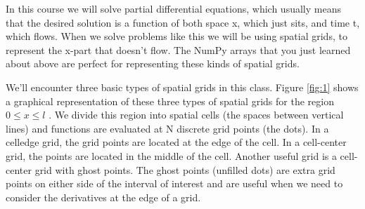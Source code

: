     In this course we will solve partial differential equations, which usually means that the desired solution is a function of both space x, which just sits, and time t, which flows. When we solve problems like this we will be using spatial grids, to represent the x-part that doesn\rq t flow. The NumPy arrays that you just learned about above are perfect for representing these kinds of spatial grids. 
    
    We\rq ll encounter three basic types of spatial grids in this class. Figure \ref{fig:1} shows a graphical representation of these three types of spatial grids for the region 
    \begin{math}0\leqslant x \leqslant l \end{math} . We divide this region into spatial cells (the spaces between vertical lines) and functions are evaluated at N discrete grid points (the dots). In a celledge grid, the grid points are located at the edge of the cell. In a cell-center grid, the points are located in the middle of the cell. Another useful grid is a cell-center grid with ghost points. The ghost points (unfilled dots) are extra grid points on either side of the interval of interest and are useful when we need to consider the derivatives at the edge of a grid.

